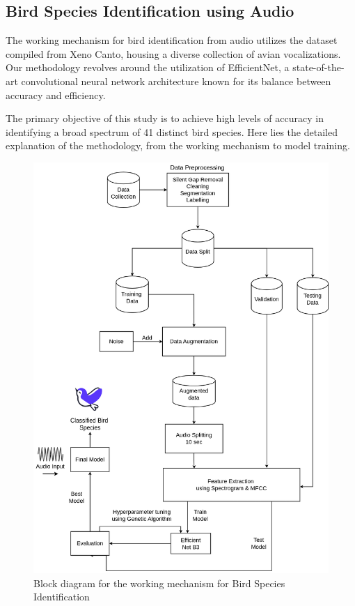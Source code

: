 \subsection{Bird Species Identification using Audio}
The working mechanism for bird identification from audio utilizes the dataset
compiled from Xeno Canto, housing a diverse collection of avian vocalizations.
Our methodology revolves around the utilization of EfficientNet, a
state-of-the-art convolutional neural network architecture known for its
balance between accuracy and efficiency.

The primary objective of this study is to achieve high levels of accuracy in
identifying a broad spectrum of 41 distinct bird species. Here lies the
detailed explanation of the methodology, from the working mechanism to model
training.
\begin{figure}[h!]
    \centering
    \includegraphics[scale=0.33]{images/IdentificationMethodology.png}
    \caption{Block diagram for the working mechanism for Bird Species Identification}%
\end{figure}
\newpage

